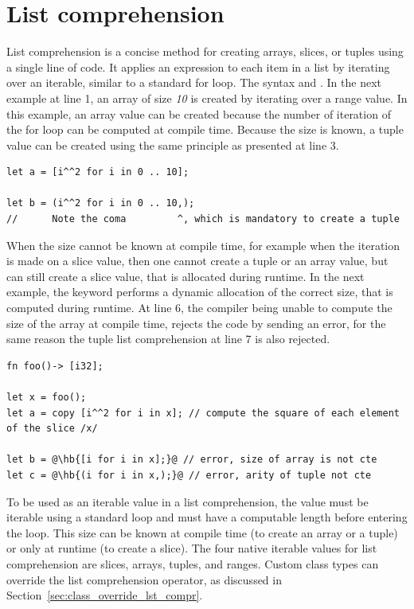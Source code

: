 \section{List comprehension}%
\label{sec:flow:list_compr}

List comprehension is a concise method for creating arrays, slices, or tuples
using a single line of code. It applies an expression to each item in a list by
iterating over an iterable, similar to a standard for loop. The syntax  and . In the next
example at line 1, an array of size \textit{10} is created by iterating over a
range value. In this example, an array value can be created because the number
of iteration of the for loop can be computed at compile time. Because the size
is known, a tuple value can be created using the same principle as presented at
line 3.

\begin{lstlisting}[style=coloredverbatim]
let a = [i^^2 for i in 0 .. 10];

let b = (i^^2 for i in 0 .. 10,);
//      Note the coma         ^, which is mandatory to create a tuple
\end{lstlisting}

When the size cannot be known at compile time, for example when the iteration is
made on a slice value, then one cannot create a tuple or an array value, but can
still create a slice value, that is allocated during runtime. In the next
example, the keyword  performs a dynamic allocation of the correct
size, that is computed during runtime. At line 6, the compiler being unable to
compute the size of the array at compile time, rejects the code by sending an
error, for the same reason the tuple list comprehension at line 7 is also
rejected.

\begin{lstlisting}[style=coloredverbatimError, escapechar=@]
fn foo()-> [i32];

let x = foo();
let a = copy [i^^2 for i in x]; // compute the square of each element of the slice /x/

let b = @\hb{[i for i in x];}@ // error, size of array is not cte
let c = @\hb{(i for i in x,);}@ // error, arity of tuple not cte
\end{lstlisting}

To be used as an iterable value in a list comprehension, the value must be
iterable using a standard  loop and must have a computable length
before entering the loop. This size can be known at compile time (to create an
array or a tuple) or only at runtime (to create a slice). The four native
iterable values for list comprehension are slices, arrays, tuples, and ranges.
Custom class types can override the list comprehension operator, as discussed in
Section~\ref{sec:class_override_lst_compr}.

